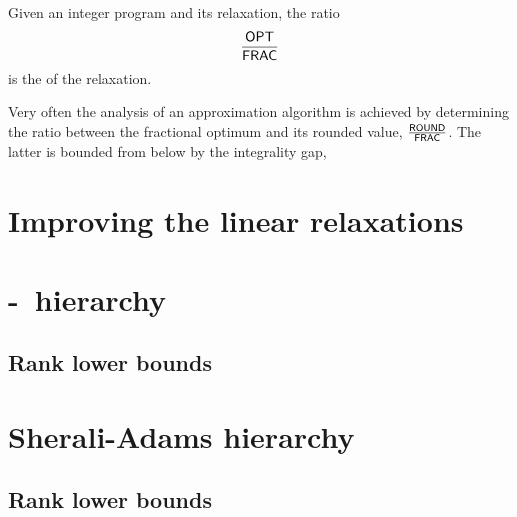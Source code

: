 \documentclass[a4paper,twoside,justified]{tufte-handout}
\begin{document}
\begin{definition}
  Given an integer program and its relaxation, the ratio 
\begin{equation}
  \frac{\mathsf{OPT}}{\mathsf{FRAC}}
\end{equation}
is the  of the relaxation.
\end{definition}

Very often the analysis of an approximation algorithm is achieved by
determining the ratio between the fractional optimum and its rounded
value, $ \frac{\mathsf{ROUND}}{\mathsf{FRAC}} $. The latter is bounded from below by
the integrality gap, 

\section{Improving the linear relaxations}


\section{\Lovasz-\Schrijver\ hierarchy}

\subsection{Rank lower bounds}

\section{Sherali-Adams hierarchy}

\subsection{Rank lower bounds}




\end{document}
